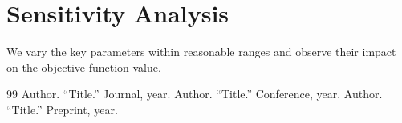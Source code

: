 \section{Sensitivity Analysis}

We vary the key parameters within reasonable ranges and observe their impact on the
objective function value.

\begin{thebibliography}{99}
   Author. ``Title.'' Journal, year.
   Author. ``Title.'' Conference, year.
   Author. ``Title.'' Preprint, year.
\end{thebibliography}
